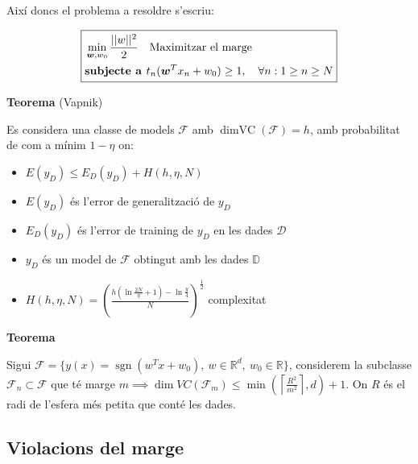 \documentclass[a4paper]{article}
\newcommand*{\op}[1]{\operatorname{#1}}
\newcommand*{\bmath}[1]{\boldsymbol{#1}}
\begin{document}
Així doncs el problema a resoldre s'escriu:

$$
\boxed{
\begin{aligned}
& \min_{\bmath{w},w_0} \frac{||w||^2}{2} \quad \text{Maximitzar el marge} \\
& \text{\textbf{subjecte a }} t_n (\bmath{w}^T x_n + w_0) \ge 1, \quad \forall n : 1 \ge n \ge N
\end{aligned}
}
$$

\textbf{Teorema} (Vapnik)

Es considera una classe de models $\mathcal{F}$ amb $\op{dimVC}(\mathcal{F}) = h$, amb probabilitat de com a mínim $1 - \eta$ on:

\begin{itemize}
	\item $E(y_D) \le E_D (y_D) + H(h, \eta, N)$ 
	\item $E(y_D)$ és l'error de generalització de $y_D$
	\item $E_D(y_D)$ és l'error de training de $y_D$ en les dades $\mathcal{D}$
	\item $y_D$ és un model de $\mathcal{F}$ obtingut amb les dades $\mathbb{D}$
	\item $H(h, \eta, N) = \left( \frac{h(\ln \frac{2N}{\eta} + 1) - \ln \frac{y}{4}}{N} \right)^{\frac{1}{2}}$ complexitat
\end{itemize}

\textbf{Teorema}

Sigui $\mathcal{F} = \{ y(x) = \op{sgn}(w^T x + w_0), \ w \in \mathbb{R}^d, \ w_0 \in \mathbb{R} \}$, considerem la subclasse $\mathcal{F}_n \subset \mathcal{F}$ que té marge $m \implies \dim VC(\mathcal{F}_m) \le \min \left( \left\lceil \frac{R^2}{m^2} \right\rceil, d \right) + 1$. On $R$ és el radi de l'esfera més petita que conté les dades. 

\subsection{Violacions del marge}

\end{document}

